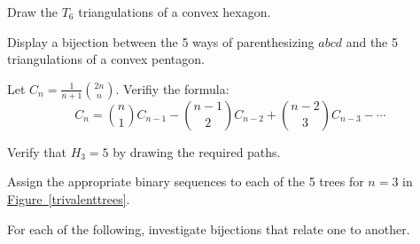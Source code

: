 \documentclass[10pt,]{book}
\theoremstyle{plain}
\theoremstyle{definition}
\theoremstyle{definition}
\theoremstyle{definition}
\theoremstyle{definition}
\numberwithin{equation}{chapter}
\begin{document}
\begin{divisionexercise}{8}\hypertarget{exercise-58}{}
\hypertarget{p-925}{}%
Draw the \(T_{6}\) triangulations of a convex hexagon.%
\end{divisionexercise}%
\begin{divisionexercise}{9}\hypertarget{exercise-59}{}
\hypertarget{p-926}{}%
Display a bijection between the 5 ways of parenthesizing \(abcd\) and the 5 triangulations of a convex pentagon.%
\end{divisionexercise}%
\begin{divisionexercise}{10}\hypertarget{exercise-60}{}
\hypertarget{p-927}{}%
Let \(C_{n} = \frac{1}{n + 1}\binom{2n}{n}.\) Verifiy the formula:%
\begin{equation*}
C_{n} = \binom{n}{1} C_{n - 1} - \binom{n - 1}{2} C_{n - 2} + \binom{n - 2}{3} C_{n - 3} - \cdots
\end{equation*}
%
\end{divisionexercise}%
\begin{divisionexercise}{11}\hypertarget{exercise-61}{}
\hypertarget{p-928}{}%
Verify that \(H_{3} = 5\) by drawing the required paths.%
\end{divisionexercise}%
\begin{divisionexercise}{12}\hypertarget{exercise-62}{}
\hypertarget{p-929}{}%
Assign the appropriate binary sequences to each of the 5 trees for \(n=3\) in \hyperref[trivalenttrees]{Figure~\ref{trivalenttrees}}.%
\end{divisionexercise}%
\hypertarget{exercisegroup-1}{}
\par\noindent \hypertarget{p-930}{}%
For each of the following, investigate bijections that relate one to another.%
\end{document}
